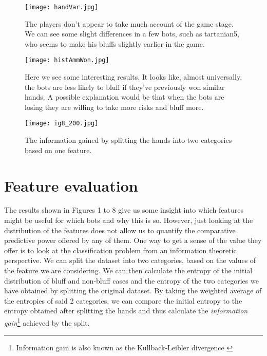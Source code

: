 \documentclass[letterpaper]{article}
\begin{document}
\clearpage

\begin{figure}[H]
    \centering
    \texttt{[image: handVar.jpg]}
    \caption{The players don't appear to take much account of the game stage. We can see some slight differences in a few bots, such as tartanian5, who seems to make his bluffs slightly earlier in the game.}
\end{figure}

\begin{figure}[H]
    \centering
    \texttt{[image: histAmmWon.jpg]}
    \caption{Here we see some interesting results. It looks like, almost universally, the bots are less likely to bluff if they've previously won similar hands. A possible explanation would be that when the bots are losing they are willing to take more risks and bluff more.}
\end{figure}

\begin{figure}[H]
    \centering
    \texttt{[image: ig8\_200.jpg]}
    \caption{The information gained by splitting the hands into two categories based on one feature.}
\end{figure}
\twocolumn
\section{
\fontsize{12pt}{15pt} 
\selectfont
Feature evaluation}
\fontsize{10pt}{12pt} 
\selectfont
The results shown in Figures 1 to 8 give us some insight into which features might be useful for which bots and why this is so. However, just looking at the distribution of the features does not allow us to quantify the comparative predictive power offered by any of them. One way to get a sense of the value they offer is to look at the classification problem from an information theoretic perspective. We can split the dataset into two categories, based on the values of the feature we are considering. We can then calculate the entropy of the initial distribution of bluff and non-bluff cases and the entropy of the two categories we have obtained by splitting the original dataset. By taking the weighted average of the entropies of said 2 categories, we can compare the initial entropy to the entropy obtained after splitting the hands and thus calculate the \emph{information gain}\footnote{Information gain is also known as the Kullback-Leibler divergence \cite{P14}} achieved by the split. 
\end{document}
